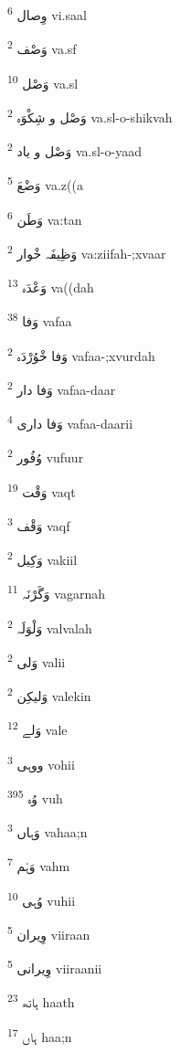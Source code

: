 \documentclass[12pt]{article}
\begin{document}
\begin{RTL}
\begin{multicols}{5}
{\ur وِصال}   \textsuperscript{6} vi.saal

{\ur وَصْف}   \textsuperscript{2} va.sf

{\ur وَصْل}   \textsuperscript{10} va.sl

{\ur وَصْل و شِکْوَہ}   \textsuperscript{2} va.sl-o-shikvah

{\ur وَصْل و یاد}   \textsuperscript{2} va.sl-o-yaad

{\ur وَضْعَ}   \textsuperscript{5} va.z((a

{\ur وَطَن}   \textsuperscript{6} va:tan

{\ur وَظِیفَہ خْوار}   \textsuperscript{2} va:ziifah-;xvaar

{\ur وَعْدَہ}   \textsuperscript{13} va((dah

{\ur وَفا}   \textsuperscript{38} vafaa

{\ur وَفا خْوُرْدَہ}   \textsuperscript{2} vafaa-;xvurdah

{\ur وَفا دار}   \textsuperscript{2} vafaa-daar

{\ur وَفا داری}   \textsuperscript{4} vafaa-daarii

{\ur وُفُور}   \textsuperscript{2} vufuur

{\ur وَقْت}   \textsuperscript{19} vaqt

{\ur وَقْف}   \textsuperscript{3} vaqf

{\ur وَکِیل}   \textsuperscript{2} vakiil

{\ur وَگَرْنَہ}   \textsuperscript{11} vagarnah

{\ur وَلْوَلَہ}   \textsuperscript{2} valvalah

{\ur وَلی}   \textsuperscript{2} valii

{\ur وَلیکِن}   \textsuperscript{2} valekin

{\ur وَلے}   \textsuperscript{12} vale

{\ur ووہی}   \textsuperscript{3} vohii

{\ur وُہ}   \textsuperscript{395} vuh

{\ur وَہاں}   \textsuperscript{3} vahaa;n

{\ur وَہْم}   \textsuperscript{7} vahm

{\ur وُہی}   \textsuperscript{10} vuhii

{\ur وِیران}   \textsuperscript{5} viiraan

{\ur وِیرانی}   \textsuperscript{5} viiraanii

{\ur ہاتھ}   \textsuperscript{23} haath

{\ur ہاں}   \textsuperscript{17} haa;n


\end{multicols}
\end{RTL}
\end{document}
